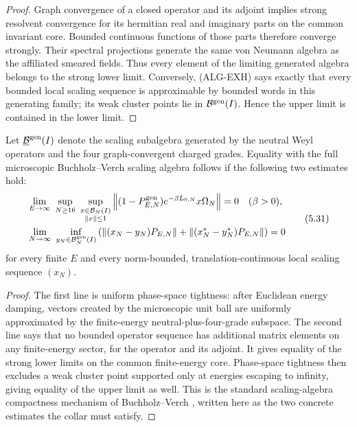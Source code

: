 \begin{proof}
Graph convergence of a closed operator and its adjoint implies strong
resolvent convergence for its hermitian real and imaginary parts on the
common invariant core.  Bounded continuous functions of those parts
therefore converge strongly.  Their spectral projections generate the
same von Neumann algebra as the affiliated smeared fields.  Thus every
element of the limiting generated algebra belongs to the strong lower
limit.  Conversely, \textup{(ALG-EXH)} says exactly that every bounded local
scaling sequence is approximable by bounded words in this generating
family; its weak cluster points lie in $\mathcal B^{\rm gen}(I)$.  Hence the
upper limit is contained in the lower limit.
\end{proof}

\begin{proposition}
\label{prop:BVexhaustion}
Let $\underline{\mathcal B}^{\rm gen}(I)$ denote the scaling subalgebra generated
by the neutral Weyl operators and the four graph-convergent charged
grades.  Equality with the full microscopic Buchholz--Verch scaling
algebra follows if the following two estimates hold:
\[
\begin{split}
 &\lim_{E\to\infty}\ \sup_{N\ge16}\
 \sup_{\substack{x\in\B_N(I)\\\norm{x}\le1}}
 \norm{(1-P^{\rm gen}_{E,N})e^{-\beta L_{0,N}}x\Omega_N}=0
 \quad(\beta>0),\\
 &\lim_{N\to\infty}\ 
 \inf_{y_N\in\B_N^{\rm gen}(I)}
 \left(
 \norm{(x_N-y_N)P_{E,N}}
 +\norm{(x_N^*-y_N^*)P_{E,N}}
 \right)=0
\end{split}
\tag{5.31}\label{eq:EXHsharp}
\]
for every finite $E$ and every norm-bounded, translation-continuous
local scaling sequence $(x_N)$.
\end{proposition}

\begin{proof}
The first line is uniform phase-space tightness: after Euclidean energy
damping, vectors created by the microscopic unit ball are uniformly
approximated by the finite-energy neutral-plus-four-grade subspace.  The
second line says that no bounded operator sequence has additional
matrix elements on any finite-energy sector, for the operator and its
adjoint.  It gives equality of the strong lower limits on the common
finite-energy core.  Phase-space tightness then excludes a weak cluster
point supported only at energies escaping to infinity, giving equality
of the upper limit as well.  This is the standard scaling-algebra
compactness mechanism of Buchholz--Verch \cite{BuchholzVerch}, written
here as the two concrete estimates the collar must satisfy.
\end{proof}

